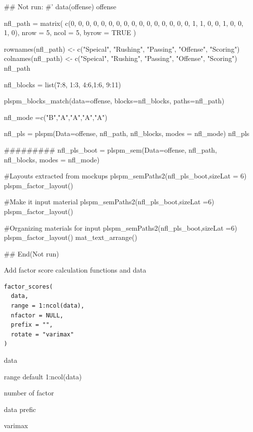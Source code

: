 \documentclass[a4paper]{book}
\begin{document}
\begin{Examples}
\begin{ExampleCode}

## Not run: 
#'
data(offense)
offense %

nfl_path = matrix(
  c(0, 0, 0, 0, 0,
    0, 0, 0, 0, 0,
    0, 0, 0, 0, 0,
    0, 1, 1, 0, 0,
    1, 0, 0, 1, 0),
  nrow = 5, ncol = 5, byrow = TRUE )

rownames(nfl_path) <- c("Speical", "Rushing", "Passing", "Offense", "Scoring")
colnames(nfl_path) <- c("Speical", "Rushing", "Passing", "Offense", "Scoring")
nfl_path

nfl_blocks = list(7:8, 1:3, 4:6,1:6, 9:11)

plspm_blocks_match(data=offense, blocks=nfl_blocks,
                   paths=nfl_path)

nfl_mode =c("B","A","A","A","A")

nfl_pls = plspm(Data=offense, nfl_path, nfl_blocks, modes = nfl_mode)
nfl_pls%

#########
nfl_pls_boot = plspm_sem(Data=offense, nfl_path, nfl_blocks, modes = nfl_mode)

#Layouts extracted from mockups
plspm_semPaths2(nfl_pls_boot,sizeLat = 6)%
  plspm_factor_layout()

#Make it input material
plspm_semPaths2(nfl_pls_boot,sizeLat =6)%
  plspm_factor_layout() %

#Organizing materials for input
plspm_semPaths2(nfl_pls_boot,sizeLat =6)%
  plspm_factor_layout() %
  mat_text_arrange()

## End(Not run)



\end{ExampleCode}
\end{Examples}
%
\begin{Description}
Add factor score calculation functions and data
\end{Description}
%
\begin{Usage}
\begin{verbatim}
factor_scores(
  data,
  range = 1:ncol(data),
  nfactor = NULL,
  prefix = "",
  rotate = "varimax"
)
\end{verbatim}
\end{Usage}
%
\begin{Arguments}
\begin{ldescription}
\item[\code{data}] data

\item[\code{range}] range default 1:ncol(data)

\item[\code{nfactor}] number of factor

\item[\code{prefix}] data prefic

\item[\code{rotate}] varimax
\end{ldescription}
\end{Arguments}
\end{document}

